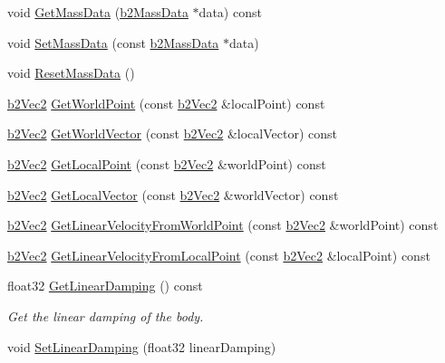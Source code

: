 \begin{DoxyCompactItemize}
\item 
void \hyperlink{classb2_body_a5100927dbd39dd0addea79d5f323f3f1}{Get\+Mass\+Data} (\hyperlink{structb2_mass_data}{b2\+Mass\+Data} $\ast$data) const
\item 
void \hyperlink{classb2_body_a58a641fedf8a81e1e26d09ec00a22fe2}{Set\+Mass\+Data} (const \hyperlink{structb2_mass_data}{b2\+Mass\+Data} $\ast$data)
\item 
void \hyperlink{classb2_body_a109d8567c6ae84c61fce2919fb209c63}{Reset\+Mass\+Data} ()
\item 
\hyperlink{structb2_vec2}{b2\+Vec2} \hyperlink{classb2_body_a712b782c61963c6f07beca86acc631ae}{Get\+World\+Point} (const \hyperlink{structb2_vec2}{b2\+Vec2} \&local\+Point) const
\item 
\hyperlink{structb2_vec2}{b2\+Vec2} \hyperlink{classb2_body_ae8c434785b2a730f7c385e708b345bb6}{Get\+World\+Vector} (const \hyperlink{structb2_vec2}{b2\+Vec2} \&local\+Vector) const
\item 
\hyperlink{structb2_vec2}{b2\+Vec2} \hyperlink{classb2_body_a0df8f4312ab23223489323326b2d763d}{Get\+Local\+Point} (const \hyperlink{structb2_vec2}{b2\+Vec2} \&world\+Point) const
\item 
\hyperlink{structb2_vec2}{b2\+Vec2} \hyperlink{classb2_body_aed2f88179cedf4cdbdc47429ebe41288}{Get\+Local\+Vector} (const \hyperlink{structb2_vec2}{b2\+Vec2} \&world\+Vector) const
\item 
\hyperlink{structb2_vec2}{b2\+Vec2} \hyperlink{classb2_body_a5bc9a483e5f59199daa1751786034c1d}{Get\+Linear\+Velocity\+From\+World\+Point} (const \hyperlink{structb2_vec2}{b2\+Vec2} \&world\+Point) const
\item 
\hyperlink{structb2_vec2}{b2\+Vec2} \hyperlink{classb2_body_a0ac0a4ad6ac3c7804652d9994239dcbd}{Get\+Linear\+Velocity\+From\+Local\+Point} (const \hyperlink{structb2_vec2}{b2\+Vec2} \&local\+Point) const
\item 
\mbox{\label{classb2_body_aff6bc518ea0f07fa5bba7cb7782e86d1}} 
float32 \hyperlink{classb2_body_aff6bc518ea0f07fa5bba7cb7782e86d1}{Get\+Linear\+Damping} () const
\begin{DoxyCompactList}\small\item\em Get the linear damping of the body. \end{DoxyCompactList}\item 
\mbox{\label{classb2_body_a909f9753ad700f70282a56e00bc182a5}} 
void \hyperlink{classb2_body_a909f9753ad700f70282a56e00bc182a5}{Set\+Linear\+Damping} (float32 linear\+Damping)

\end{DoxyCompactItemize}
